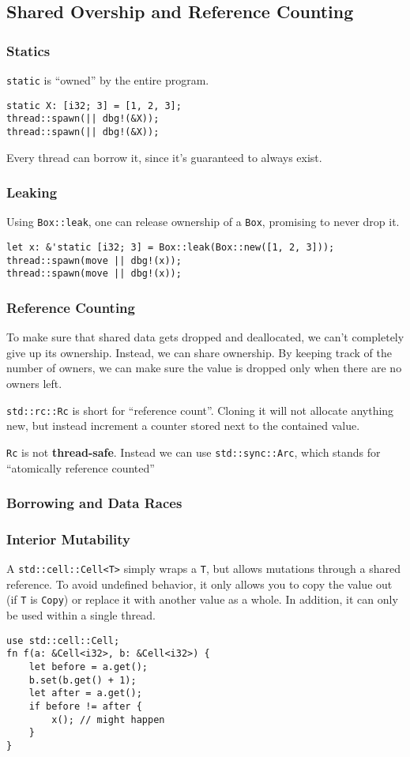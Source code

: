 \documentclass[11pt]{article}
\begin{document}
\subsection{Shared Overship and Reference Counting}
\label{sec:orgd229acb}
\subsubsection{Statics}
\label{sec:org51b7913}
\texttt{static} is ``owned'' by the entire program.
\begin{verbatim}
static X: [i32; 3] = [1, 2, 3];
thread::spawn(|| dbg!(&X));
thread::spawn(|| dbg!(&X));
\end{verbatim}
Every thread can borrow it, since it's guaranteed to always exist.
\subsubsection{Leaking}
\label{sec:org0faaa0e}
Using \texttt{Box::leak}, one can release ownership of a \texttt{Box}, promising to never drop it.
\begin{verbatim}
let x: &'static [i32; 3] = Box::leak(Box::new([1, 2, 3]));
thread::spawn(move || dbg!(x));
thread::spawn(move || dbg!(x));
\end{verbatim}
\subsubsection{Reference Counting}
\label{sec:org4099f7d}
To make sure that shared data gets dropped and deallocated, we can’t completely give up its
ownership. Instead, we can share ownership. By keeping track of the number of owners, we can
make sure the value is dropped only when there are no owners left.

\texttt{std::rc::Rc} is short for ``reference count''. Cloning it will not allocate anything new, but
instead increment a counter stored next to the contained value.

\texttt{Rc} is not \textbf{thread-safe}. Instead we can use \texttt{std::sync::Arc}, which stands for ``atomically
reference counted''
\subsubsection{Borrowing and Data Races}
\label{sec:orgedd671b}
\subsubsection{Interior Mutability}
\label{sec:orgfed2fe0}
A \texttt{std::cell::Cell<T>} simply wraps a \texttt{T}, but allows mutations through a shared reference. To avoid
undefined behavior, it only allows you to copy the value out (if \texttt{T} is \texttt{Copy}) or replace it with
another value as a whole. In addition, it can only be used within a single thread.
\begin{verbatim}
use std::cell::Cell;
fn f(a: &Cell<i32>, b: &Cell<i32>) {
    let before = a.get();
    b.set(b.get() + 1);
    let after = a.get();
    if before != after {
        x(); // might happen
    }
}
\end{verbatim}
\end{document}
